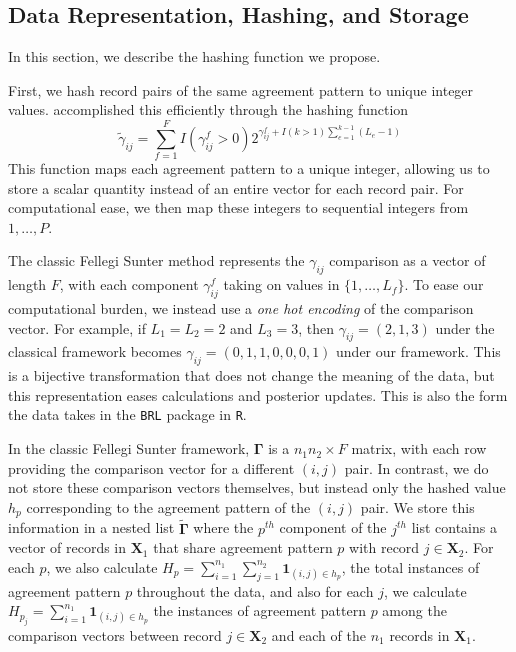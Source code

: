\documentclass[12pt,letterpaper]{article}
\newcommand{\1}[1]{\mathbb{I}\!\left[#1\right]} %
\begin{document}

\hypertarget{data-representation-hashing-and-storage}{%
	\subsection{Data Representation, Hashing, and
		Storage}\label{data-representation-hashing-and-storage}}
		
In this section, we describe the hashing function we propose. 		

First, we hash record pairs of the same agreement pattern to unique integer values. \citep{enamorado2019} accomplished this efficiently through the hashing function
$$\tilde{\gamma}_{ij} = \sum_{f = 1}^F I(\gamma_{ij}^f > 0)2^{\gamma_{ij}^f + I(k>1)\sum_{e=1}^{k-1}(L_e -1)}$$
This function maps each agreement pattern to a unique integer, allowing us to store a scalar quantity instead of an entire vector for each record pair. For computational ease, we then map these integers to sequential integers from $1, \ldots, P.$

The classic Fellegi Sunter method represents the \(\gamma_{ij}\)
comparison as a vector of length \(F\), with each component
\(\gamma_{ij}^f\) taking on values in \(\{1, \ldots, L_f \}\). 
To ease our computational burden, we instead use a \emph{one hot encoding} of the comparison vector. For example, if
\(L_1 = L_2 = 2\) and \(L_3 = 3\), then \(\gamma_{ij} = (2, 1, 3)\)
under the classical framework becomes
\(\gamma_{ij} = (0, 1, 1, 0, 0, 0, 1)\) under our framework. This is a
bijective transformation that does not change the meaning of the data,
but this representation eases calculations and posterior updates. This is also the form the data takes in the \texttt{BRL} package in \texttt{R}. 

In the classic Fellegi Sunter framework, $\bm{\Gamma}$ is a
\(n_1 n_2 \times F\) matrix, with each row providing the comparison
vector for a different \((i,j)\) pair. In contrast, we do not store
these comparison vectors themselves, but instead only the hashed value $h_p$
corresponding to the agreement pattern of the \((i, j)\) pair. We store
this information in a nested list $\tilde{\bm{\Gamma}}$ where the
\(p^{th}\) component of the \(j^{th}\) list contains a vector of records
in \(\bm{X}_1\) that share agreement pattern \(p\) with record \(j \in \bm{X}_2\). For
each \(p\), we also calculate
\(H_p = \sum_{i=1}^{n_1}\sum_{j=1}^{n_2} \mathbf{1}_{(i,j) \in h_p}\),
the total instances of agreement pattern \(p\) throughout the data, and
also for each \(j\), we calculate
\(H_{p_j} = \sum_{i=1}^{n_1} \mathbf{1}_{{(i,j) \in h_p}}\) the
instances of agreement pattern \(p\) among the comparison vectors
between record \(j \in \bm{X}_2\) and each of the \(n_1\) records in \(\bm{X}_1\).
\end{document}
